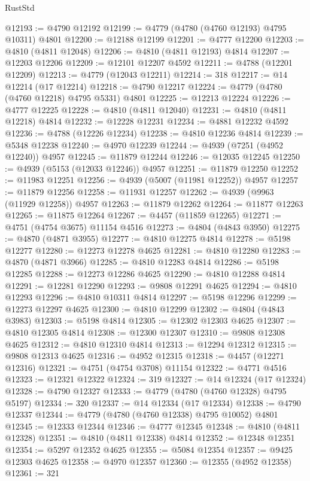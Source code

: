 \begin{lexlean}{RustStd}
\begin{coremodule}
@12193 := @4790 @12192
@12199 := @4779 (@4780 (@4760 @12193) @4795 @10311) @4801
@12200 := @12188 @12199
@12201 := @4777 @12200
@12203 := @4810 (@4811 @12048)
@12206 := @4810 (@4811 @12193) @4814
@12207 := @12203 @12206
@12209 := @12101 @12207 @4592
@12211 := @4788 (@12201 @12209)
@12213 := @4779 (@12043 @12211)
@12214 := 318
@12217 := @14 @12214 (@17 @12214)
@12218 := @4790 @12217
@12224 := @4779 (@4780 (@4760 @12218) @4795 @5331) @4801
@12225 := @12213 @12224
@12226 := @4777 @12225
@12228 := @4810 (@4811 @12040)
@12231 := @4810 (@4811 @12218) @4814
@12232 := @12228 @12231
@12234 := @4881 @12232 @4592
@12236 := @4788 (@12226 @12234)
@12238 := @4810 @12236 @4814
@12239 := @5348 @12238
@12240 := @4970 @12239
@12244 := @4939 (@7251 (@4952 @12240)) @4957
@12245 := @11879 @12244
@12246 := @12035 @12245
@12250 := @4939 (@5153 (@12033 @12246)) @4957
@12251 := @11879 @12250
@12252 := @11983 @12251
@12256 := @4939 (@5007 (@11981 @12252)) @4957
@12257 := @11879 @12256
@12258 := @11931 @12257
@12262 := @4939 (@9963 (@11929 @12258)) @4957
@12263 := @11879 @12262
@12264 := @11877 @12263
@12265 := @11875 @12264
@12267 := @4457 (@11859 @12265)
@12271 := @4751 (@4754 @3675) @11154 @4516
@12273 := @4804 (@4843 @3950)
@12275 := @4870 (@4871 @3955)
@12277 := @4810 @12275 @4814
@12278 := @5198 @12277
@12280 := @12273 @12278 @4625
@12281 := @4810 @12280
@12283 := @4870 (@4871 @3966)
@12285 := @4810 @12283 @4814
@12286 := @5198 @12285
@12288 := @12273 @12286 @4625
@12290 := @4810 @12288 @4814
@12291 := @12281 @12290
@12293 := @9808 @12291 @4625
@12294 := @4810 @12293
@12296 := @4810 @10311 @4814
@12297 := @5198 @12296
@12299 := @12273 @12297 @4625
@12300 := @4810 @12299
@12302 := @4804 (@4843 @3983)
@12303 := @5198 @4814
@12305 := @12302 @12303 @4625
@12307 := @4810 @12305 @4814
@12308 := @12300 @12307
@12310 := @9808 @12308 @4625
@12312 := @4810 @12310 @4814
@12313 := @12294 @12312
@12315 := @9808 @12313 @4625
@12316 := @4952 @12315
@12318 := @4457 (@12271 @12316)
@12321 := @4751 (@4754 @3708) @11154
@12322 := @4771 @4516
@12323 := @12321 @12322
@12324 := 319
@12327 := @14 @12324 (@17 @12324)
@12328 := @4790 @12327
@12333 := @4779 (@4780 (@4760 @12328) @4795 @5197)
@12334 := 320
@12337 := @14 @12334 (@17 @12334)
@12338 := @4790 @12337
@12344 := @4779 (@4780 (@4760 @12338) @4795 @10052) @4801
@12345 := @12333 @12344
@12346 := @4777 @12345
@12348 := @4810 (@4811 @12328)
@12351 := @4810 (@4811 @12338) @4814
@12352 := @12348 @12351
@12354 := @5297 @12352 @4625
@12355 := @5084 @12354
@12357 := @9425 @12303 @4625
@12358 := @4970 @12357
@12360 := @12355 (@4952 @12358)
@12361 := 321

\end{coremodule}
\end{lexlean}
